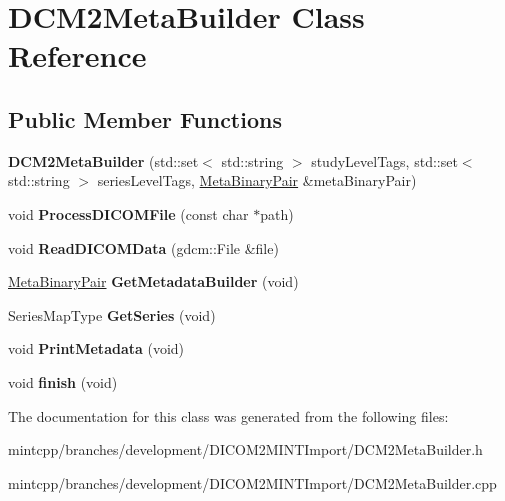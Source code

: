 \hypertarget{class_d_c_m2_meta_builder}{
\section{DCM2MetaBuilder Class Reference}
\label{class_d_c_m2_meta_builder}
}
\subsection*{Public Member Functions}
\begin{DoxyCompactItemize}
\item 
\hypertarget{class_d_c_m2_meta_builder_a04a849f7424486fe84115789efc31006}{
{\bfseries DCM2MetaBuilder} (std::set$<$ std::string $>$ studyLevelTags, std::set$<$ std::string $>$ seriesLevelTags, \hyperlink{class_meta_binary_pair}{MetaBinaryPair} \&metaBinaryPair)}
\label{class_d_c_m2_meta_builder_a04a849f7424486fe84115789efc31006}

\item 
\hypertarget{class_d_c_m2_meta_builder_a9976228916d3660928589e34c34f5b5c}{
void {\bfseries ProcessDICOMFile} (const char $\ast$path)}
\label{class_d_c_m2_meta_builder_a9976228916d3660928589e34c34f5b5c}

\item 
\hypertarget{class_d_c_m2_meta_builder_a0b1075331b7e5d4439637e6fbe45ec20}{
void {\bfseries ReadDICOMData} (gdcm::File \&file)}
\label{class_d_c_m2_meta_builder_a0b1075331b7e5d4439637e6fbe45ec20}

\item 
\hypertarget{class_d_c_m2_meta_builder_ac871d6c3a1c180920762ed88a95fb239}{
\hyperlink{class_meta_binary_pair}{MetaBinaryPair} {\bfseries GetMetadataBuilder} (void)}
\label{class_d_c_m2_meta_builder_ac871d6c3a1c180920762ed88a95fb239}

\item 
\hypertarget{class_d_c_m2_meta_builder_adf2880741ca8d8847307c7b790d3a209}{
SeriesMapType {\bfseries GetSeries} (void)}
\label{class_d_c_m2_meta_builder_adf2880741ca8d8847307c7b790d3a209}

\item 
\hypertarget{class_d_c_m2_meta_builder_a0392302fb08345393d5b1c9ca25d4f53}{
void {\bfseries PrintMetadata} (void)}
\label{class_d_c_m2_meta_builder_a0392302fb08345393d5b1c9ca25d4f53}

\item 
\hypertarget{class_d_c_m2_meta_builder_a9b896c917969459c88c75b83e1c741a1}{
void {\bfseries finish} (void)}
\label{class_d_c_m2_meta_builder_a9b896c917969459c88c75b83e1c741a1}

\end{DoxyCompactItemize}


The documentation for this class was generated from the following files:\begin{DoxyCompactItemize}
\item 
mintcpp/branches/development/DICOM2MINTImport/DCM2MetaBuilder.h\item 
mintcpp/branches/development/DICOM2MINTImport/DCM2MetaBuilder.cpp\end{DoxyCompactItemize}
